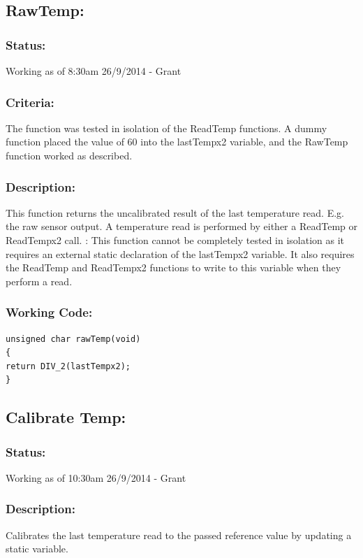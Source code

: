 \documentclass[]{report}
\begin{document}
\subsection{RawTemp:}

\subsubsection{Status:}
Working as of 8:30am 26/9/2014 - Grant

\subsubsection{Criteria:}
The function was tested in isolation of the ReadTemp functions. A dummy function placed the value of 60 into the lastTempx2 variable, and the RawTemp function worked as described.

\subsubsection{Description:}
This function returns the uncalibrated result of the last temperature read. E.g. the raw sensor output. A temperature read is performed by either a ReadTemp or ReadTempx2 call. \newline:
This function cannot be completely tested in isolation as it requires an external static declaration of the lastTempx2 variable. It also requires the ReadTemp and ReadTempx2 functions to write to this variable when they perform a read.

\subsubsection{Working Code:}
\begin{lstlisting}
unsigned char rawTemp(void)
{
return DIV_2(lastTempx2);
}
\end{lstlisting}

\subsection{Calibrate Temp:}
\subsubsection{Status:}
Working as of 10:30am 26/9/2014 - Grant

\subsubsection{Description:}
Calibrates the last temperature read to the passed reference value by updating a static variable.
\end{document}
